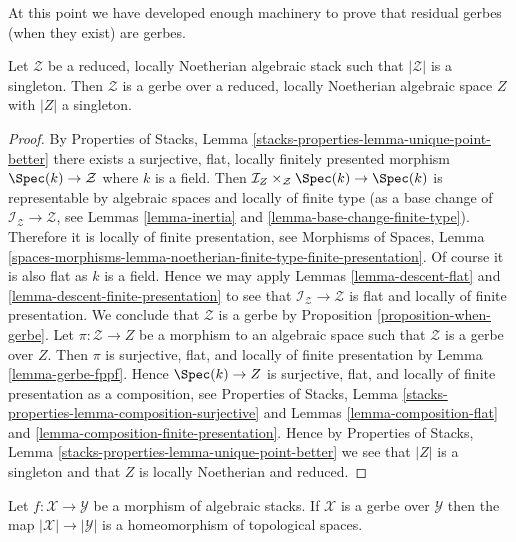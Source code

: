 \noindent
At this point we have developed enough machinery to prove that residual
gerbes (when they exist) are gerbes.

\begin{lemma}
\label{lemma-noetherian-singleton-stack-gerbe}
Let $\mathcal{Z}$ be a reduced, locally Noetherian algebraic stack
such that $|\mathcal{Z}|$ is a singleton. Then $\mathcal{Z}$ is a gerbe
over a reduced, locally Noetherian algebraic space $Z$ with $|Z|$ a
singleton.
\end{lemma}

\begin{proof}
By
Properties of Stacks, Lemma \ref{stacks-properties-lemma-unique-point-better}
there exists a surjective, flat, locally finitely presented morphism
$\Spec(k) \to \mathcal{Z}$ where $k$ is a field.
Then $\mathcal{I}_Z \times_\mathcal{Z} \Spec(k) \to \Spec(k)$
is representable by algebraic spaces and
locally of finite type (as a base change of
$\mathcal{I}_\mathcal{Z} \to \mathcal{Z}$, see
Lemmas \ref{lemma-inertia} and \ref{lemma-base-change-finite-type}).
Therefore it is locally of finite presentation, see
Morphisms of Spaces, Lemma
\ref{spaces-morphisms-lemma-noetherian-finite-type-finite-presentation}.
Of course it is also flat as $k$ is a field. Hence we may apply
Lemmas \ref{lemma-descent-flat} and
\ref{lemma-descent-finite-presentation}
to see that $\mathcal{I}_\mathcal{Z} \to \mathcal{Z}$ is flat and
locally of finite presentation. We conclude that $\mathcal{Z}$
is a gerbe by
Proposition \ref{proposition-when-gerbe}.
Let $\pi : \mathcal{Z} \to Z$ be a morphism to an algebraic space such
that $\mathcal{Z}$ is a gerbe over $Z$. Then $\pi$ is surjective, flat, and
locally of finite presentation by
Lemma \ref{lemma-gerbe-fppf}.
Hence $\Spec(k) \to Z$ is surjective, flat, and locally of finite
presentation as a composition, see
Properties of Stacks,
Lemma \ref{stacks-properties-lemma-composition-surjective}
and
Lemmas \ref{lemma-composition-flat} and
\ref{lemma-composition-finite-presentation}.
Hence by
Properties of Stacks, Lemma \ref{stacks-properties-lemma-unique-point-better}
we see that $|Z|$ is a singleton and that $Z$ is locally Noetherian
and reduced.
\end{proof}

\begin{lemma}
\label{lemma-gerbe-bijection-points}
Let $f : \mathcal{X} \to \mathcal{Y}$ be a morphism of algebraic stacks.
If $\mathcal{X}$ is a gerbe over $\mathcal{Y}$ then the map
$|\mathcal{X}| \to |\mathcal{Y}|$ is a homeomorphism of topological spaces.
\end{lemma}

